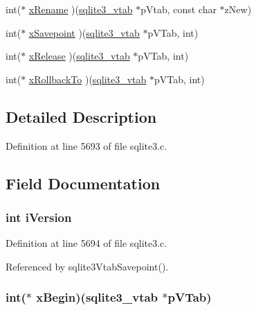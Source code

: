 \begin{DoxyCompactItemize}
\item 
int($\ast$ \hyperlink{structsqlite3__module_a0e5483244b80bf1a818c40d2317f313b}{x\+Rename} )(\hyperlink{structsqlite3__vtab}{sqlite3\+\_\+vtab} $\ast$p\+Vtab, const char $\ast$z\+New)
\item 
int($\ast$ \hyperlink{structsqlite3__module_a48098f89820c71bfa3cf4ec8a0e2b51a}{x\+Savepoint} )(\hyperlink{structsqlite3__vtab}{sqlite3\+\_\+vtab} $\ast$p\+V\+Tab, int)
\item 
int($\ast$ \hyperlink{structsqlite3__module_a81269f73be0d10c575308d9ba552fb42}{x\+Release} )(\hyperlink{structsqlite3__vtab}{sqlite3\+\_\+vtab} $\ast$p\+V\+Tab, int)
\item 
int($\ast$ \hyperlink{structsqlite3__module_a60182ac3b9950dcfd82b2aeea5bd0451}{x\+Rollback\+To} )(\hyperlink{structsqlite3__vtab}{sqlite3\+\_\+vtab} $\ast$p\+V\+Tab, int)
\end{DoxyCompactItemize}


\subsection{Detailed Description}


Definition at line 5693 of file sqlite3.\+c.



\subsection{Field Documentation}
\hypertarget{structsqlite3__module_a1138620d71393e6105389670719d9685}{}
\subsubsection[{i\+Version}]{\setlength{\rightskip}{0pt plus 5cm}int i\+Version}\label{structsqlite3__module_a1138620d71393e6105389670719d9685}


Definition at line 5694 of file sqlite3.\+c.



Referenced by sqlite3\+Vtab\+Savepoint().

\hypertarget{structsqlite3__module_a1e8e1468248bf37543219b075df90db2}{}
\subsubsection[{x\+Begin}]{\setlength{\rightskip}{0pt plus 5cm}int($\ast$ x\+Begin)({\bf sqlite3\+\_\+vtab} $\ast$p\+V\+Tab)}\label{structsqlite3__module_a1e8e1468248bf37543219b075df90db2}


